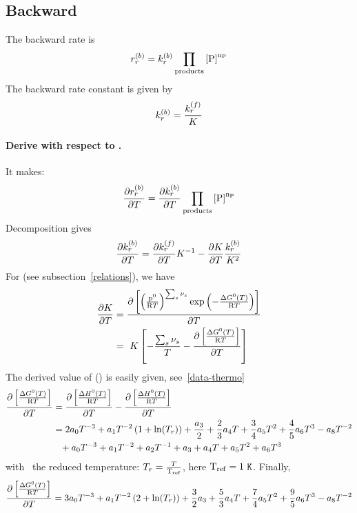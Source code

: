 \subsection{Backward}

The backward rate is
\begin{equation}
\bkwdrate[r] = \bkwdratecons[r]\prodProd
\end{equation}
The backward rate constant is given by
\begin{equation}
\bkwdratecons[r] = \frac{\fwdratecons[r]}{\Eqconst}
\end{equation}

\paragraph{Derive with respect to \Temp.}
It makes:
\begin{equation}
\doverdT{\bkwdrate[r]} = \doverdT{\bkwdratecons[r]}\prodProd
\end{equation}
Decomposition gives
\begin{equation}
\doverdT{\bkwdratecons[r]} = \doverdT{\fwdratecons[r]}\Eqconst^{-1} - \doverdT{\Eqconst}\frac{\bkwdratecons[r]}{\Eqconst^{2}}
\label{rateb-decomp}
\end{equation}
For \Eqconst (see subsection~\ref{relations}), we have
\begin{equation}
\begin{split}
\doverdT{\Eqconst} & = \doverdT{\left[\left(\frac{\pz}{\Rg \Temp}\right)^{\sum_s \scoef[s]} \exp\left(-\frac{\DGibbsZ(\Temp)}{\Rg \Temp}\right)\right]} \\
                   & = \Eqconst\left[-\frac{\sum_s\scoef[s]}{\Temp} - \doverdT{\left[\frac{\DGibbsZ(\Temp)}{\Rg \Temp}\right]}\right]
\end{split}
\end{equation}
The derived value of \DGibbsZ(\Temp) is easily given, see~\ref{data-thermo}
\begin{equation}
\begin{split}
\doverdT{\left[\frac{\DGibbsZ(\Temp)}{\Rg \Temp}\right]} 
        &= \doverdT{\left[\frac{\DenthZ(T)}{\Rg \Temp}\right]} - \doverdT{\left[\frac{\DenthZ(\Temp)}{\Rg \Temp}\right]} \\
        &= 2\tc{0}\Temp^{-3} + \tc{1}\Temp^{-2}\left(1+\ln(\RedTemp)\right) + \frac{\tc{3}}{2} + 
           \frac{2}{3}\tc{4}\Temp + \frac{3}{4}\tc{5}\Temp^{2} + \frac{4}{5}\tc{6}\Temp^3 - \tc{8}\Temp^{-2}\\
        & \spacehack + \tc{0}\Temp^{-3} + \tc{1}\Temp^{-2} + \tc{2}\Temp^{-1} + \tc{3} + \tc{4}\Temp + \tc{5} \Temp^{2} + \tc{6} \Temp^{3}
\end{split}
\end{equation}
with \RedTemp\ the reduced temperature: $\RedTemp = \frac{\Temp}{\Tref}$, here $\mathrm{T_{ref}} = 1~\mathtt{K}$.
Finally,
\begin{equation}
\doverdT{\left[\frac{\DGibbsZ(\Temp)}{\Rg \Temp}\right]} =
        3\tc{0}\Temp^{-3} + \tc{1} \Temp^{-2} \left(2 + \ln(\RedTemp)\right) + \frac{3}{2} \tc{3} + \frac{5}{3} \tc{4} \Temp
        + \frac{7}{4}\tc{5} \Temp^2 + \frac{9}{5}\tc{6} \Temp^3 - \tc{8} \Temp^{-2}
\end{equation}

